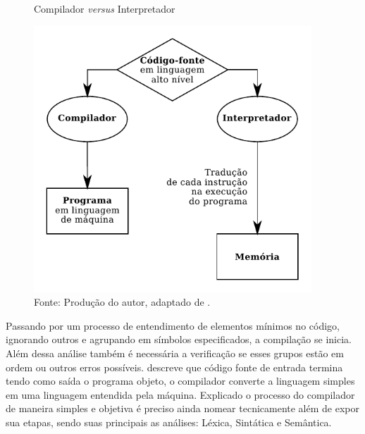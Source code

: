 \begin{figure}[h]
  \caption{\ifdraft{\color{green}}{}Compilador \textit{versus} Interpretador}\label{fig:versus}
  \centering
\includegraphics[width=\textwidth,height=10cm,keepaspectratio]{figures/compilador-interpretador.pdf}
  \caption*{\ifdraft{\color{green}}{}\footnotesize Fonte: Produção do autor, adaptado de .}
\end{figure}

Passando por um processo de entendimento de elementos mínimos no código, ignorando outros e agrupando em símbolos especificados, a compilação se inicia. Além dessa análise também é necessária a verificação se esses grupos estão em ordem ou outros erros possíveis.  descreve que código fonte de entrada termina tendo como saída o programa objeto, o compilador converte a linguagem simples em uma linguagem entendida pela máquina. Explicado o processo do compilador de maneira simples e objetiva é preciso ainda nomear tecnicamente além de expor sua etapas, sendo suas principais as análises: Léxica, Sintática e Semântica.

